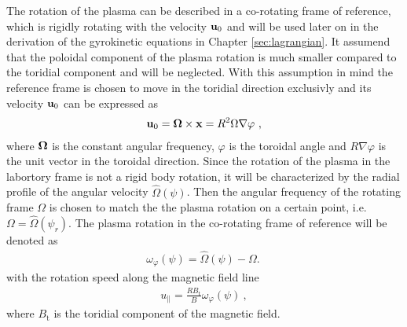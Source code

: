 The rotation of the plasma can be described in a co-rotating frame of reference, which is rigidly rotating with the velocity $\boldsymbol{\mathbf{u}}_0$ and will be used later on in the derivation of the gyrokinetic equations in Chapter \ref{sec:lagrangian}. It assumend that the poloidal component of the plasma rotation is much smaller compared to the toridial component and will be neglected. With this assumption in mind the reference frame is chosen to move in the toridial direction exclusivly and its velocity $\boldsymbol{\mathbf{u}}_0$ can be expressed as
\begin{gather}
    \boldsymbol{\mathbf{u}}_0 = \boldsymbol{\mathbf{\Omega}} \times \boldsymbol{\mathbf{x}} = R^2 \Omega \nabla \varphi~,
    \label{eq:rotvelocity}
\end{gather}
where $\boldsymbol{\mathbf{\Omega}}$ is the constant angular frequency, $\varphi$ is the toroidal angle and $R \nabla\varphi$ is the unit vector in the toroidal direction. Since the rotation of the plasma in the labortory frame is not a rigid body rotation, it will be characterized by the radial profile of the angular velocity $\hat{\Omega}(\psi)$. Then the angular frequency of the rotating frame $\Omega$ is chosen to match the the plasma rotation on a certain point, i.e. $\Omega = \hat{\Omega}(\psi_r)$. The plasma rotation in the co-rotating frame of reference will be denoted as
\begin{gather}
    \omega_\varphi(\psi) = \hat{\Omega}(\psi) - \Omega.\
    \label{eq:refFramePlasmaFrequency}
\end{gather} 
with the rotation speed along the magnetic field line 
\begin{gather}
    u_\parallel = \frac{RB_\mathrm{t}}{B} \omega_\varphi (\psi)~,
    \label{eq:rotParallelVelocity}
\end{gather}
where $B_\mathrm{t}$ is the toridial component of the magnetic field. \cite{Peeters2009B}

\newpage